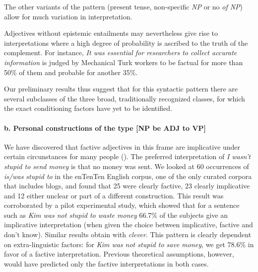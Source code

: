 \documentclass[10pt]{article}
\begin{document}
\vspace{-0.5em}
\vspace{-0.5em}

\noindent
The other variants of the pattern (present tense, non-specific \textit{NP} or no \textit{of NP}) allow for much variation in interpretation.

Adjectives without epistemic entailments may nevertheless give rise to interpretations where a high degree of probability is ascribed to the truth of the complement. For instance, \textit{It was essential for researchers to collect accurate information} is judged by Mechanical Turk workers to be factual for more than 50\% of them and probable for another 35\%. 

Our preliminary results thus suggest that for this syntactic pattern there are several subclasses of the three broad, traditionally recognized classes, for which the exact conditioning factors have yet to be identified.

\vspace{-1.0em}
\paragraph{b. Personal constructions of the type [NP be ADJ to VP]}
We have discovered that factive adjectives in this frame are implicative under certain circunstances for many people (\cite{csli-gang-cssp13}). 
The preferred interpretation of \textit{I wasn't stupid to send money} is that no money was sent. We looked at 60 occurrences of \textit{is/was stupid to} in the enTenTen English corpus, one of the only curated corpora that includes blogs, and found that 25 were clearly factive, 23 clearly implicative and 12 either unclear or part of a different construction. This result was corroborated by a pilot experimental study, which showed that for a sentence such as \textit{Kim was not stupid to waste money} 66.7\% of the subjects give an implicative interpretation (when given the choice between implicative, factive and don't know). Similar results obtain with \textit{clever}.
This pattern is clearly dependent on extra-linguistic factors: for \textit{Kim was not stupid to save money}, we get 78.6\% in favor of a factive interpretation. Previous theoretical assumptions, however, would have predicted only the factive interpretations in both cases.
\end{document}
